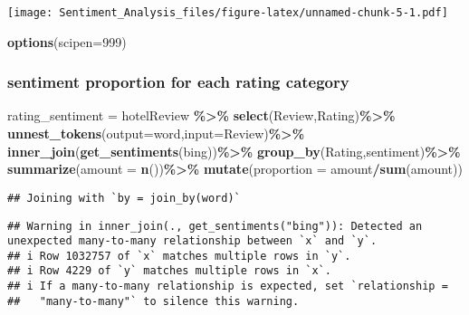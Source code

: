 \documentclass[
]{article}
\newenvironment{Shaded}{\begin{snugshade}}{\end{snugshade}}
\newcommand{\AttributeTok}[1]{\textcolor[rgb]{0.13,0.29,0.53}{#1}}
\newcommand{\DecValTok}[1]{\textcolor[rgb]{0.00,0.00,0.81}{#1}}
\newcommand{\FunctionTok}[1]{\textcolor[rgb]{0.13,0.29,0.53}{\textbf{#1}}}
\newcommand{\NormalTok}[1]{#1}
\newcommand{\OtherTok}[1]{\textcolor[rgb]{0.56,0.35,0.01}{#1}}
\newcommand{\SpecialCharTok}[1]{\textcolor[rgb]{0.81,0.36,0.00}{\textbf{#1}}}
\newcommand{\StringTok}[1]{\textcolor[rgb]{0.31,0.60,0.02}{#1}}
\begin{document}
\texttt{[image: Sentiment\_Analysis\_files/figure-latex/unnamed-chunk-5-1.pdf]}

\begin{Shaded}
\begin{Highlighting}[]
\FunctionTok{options}\NormalTok{(}\AttributeTok{scipen=}\DecValTok{999}\NormalTok{)}
\end{Highlighting}
\end{Shaded}

\hypertarget{sentiment-proportion-for-each-rating-category}{%
\subsubsection{sentiment proportion for each rating
category}\label{sentiment-proportion-for-each-rating-category}}

\begin{Shaded}
\begin{Highlighting}[]
\NormalTok{rating\_sentiment }\OtherTok{=} 
\NormalTok{  hotelReview }\SpecialCharTok{\%\textgreater{}\%}
    \FunctionTok{select}\NormalTok{(Review,Rating)}\SpecialCharTok{\%\textgreater{}\%}
    \FunctionTok{unnest\_tokens}\NormalTok{(}\AttributeTok{output=}\NormalTok{word,}\AttributeTok{input=}\NormalTok{Review)}\SpecialCharTok{\%\textgreater{}\%}
    \FunctionTok{inner\_join}\NormalTok{(}\FunctionTok{get\_sentiments}\NormalTok{(}\StringTok{\textquotesingle{}bing\textquotesingle{}}\NormalTok{))}\SpecialCharTok{\%\textgreater{}\%}
    \FunctionTok{group\_by}\NormalTok{(Rating,sentiment)}\SpecialCharTok{\%\textgreater{}\%}
    \FunctionTok{summarize}\NormalTok{(}\AttributeTok{amount =} \FunctionTok{n}\NormalTok{())}\SpecialCharTok{\%\textgreater{}\%}
    \FunctionTok{mutate}\NormalTok{(}\AttributeTok{proportion =}\NormalTok{ amount}\SpecialCharTok{/}\FunctionTok{sum}\NormalTok{(amount))}
\end{Highlighting}
\end{Shaded}

\begin{verbatim}
## Joining with `by = join_by(word)`
\end{verbatim}

\begin{verbatim}
## Warning in inner_join(., get_sentiments("bing")): Detected an unexpected many-to-many relationship between `x` and `y`.
## i Row 1032757 of `x` matches multiple rows in `y`.
## i Row 4229 of `y` matches multiple rows in `x`.
## i If a many-to-many relationship is expected, set `relationship =
##   "many-to-many"` to silence this warning.
\end{verbatim}
\end{document}
